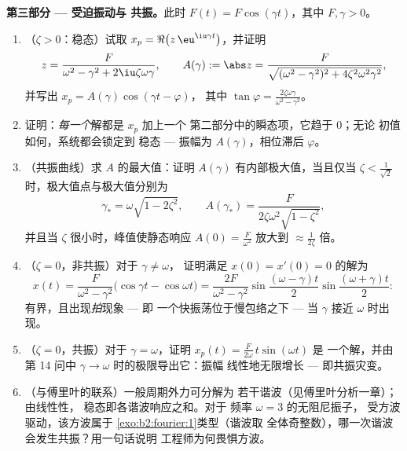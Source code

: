\begin{problem}
\medskip
\noindent\textbf{第三部分 --- 受迫振动与
共振。}此时 $F(t) = F\cos(\gamma t)$，其中 $F, \gamma > 0$。
\begin{enumerate}[resume]
  \item （$\zeta > 0$：稳态）试取 $x_p =
        \Re\bigl(z\,\eu^{\iu\gamma t}\bigr)$，并证明
        \[
        z = \frac{F}{\omega^2 - \gamma^2 +
        2\iu\zeta\omega\gamma},
        \qquad
        A(\gamma) := \abs z = \frac{F}{\sqrt{(\omega^2 -
        \gamma^2)^2 + 4\zeta^2\omega^2\gamma^2}} ,
        \]
        并写出 $x_p = A(\gamma)\cos(\gamma t - \varphi)$，
        其中 $\tan\varphi =
        \frac{2\zeta\omega\gamma}{\omega^2-\gamma^2}$。
  \item 证明：\emph{每一个}解都是 $x_p$ 加上一个
        第二部分中的瞬态项，它趋于 $0$；无论
        初值如何，系统都会锁定到
        稳态 --- 振幅为 $A(\gamma)$，相位滞后
        $\varphi$。
  \item （共振曲线）求 $A$ 的最大值：证明
        $A(\gamma)$ 有内部极大值，当且仅当 $\zeta <
        \frac{1}{\sqrt2}$ 时，极大值点与极大值分别为
        \[
        \gamma_* = \omega\sqrt{1 - 2\zeta^2},
        \qquad
        A(\gamma_*) =
        \frac{F}{2\zeta\omega^2\sqrt{1-\zeta^2}} ,
        \]
        并且当 $\zeta$ 很小时，峰值使静态响应
        $A(0) = \frac F{\omega^2}$ 放大到
        $\approx \frac{1}{2\zeta}$ 倍。
  \item （$\zeta = 0$，非共振）对于 $\gamma \neq \omega$，
        证明满足 $x(0) = x'(0) = 0$ 的解为
        \[
        x(t) = \frac{F}{\omega^2 -
        \gamma^2}\bigl(\cos\gamma t - \cos\omega t\bigr)
        = \frac{2F}{\omega^2-\gamma^2}
        \sin\frac{(\omega-\gamma)t}{2}
        \sin\frac{(\omega+\gamma)t}{2} :
        \]
        有界，且出现\emph{拍}现象 --- 即
        一个快振荡位于慢包络之下 --- 当 $\gamma$ 接近
        $\omega$ 时出现。
  \item （$\zeta = 0$，共振）对于 $\gamma = \omega$，证明
        $x_p(t) = \frac{F}{2\omega}\,t\sin(\omega t)$ 是
        一个解，并由第
        14 问中 $\gamma \to \omega$ 时的极限导出它：振幅
        线性地无限增长 --- 即共振灾变。
  \item （与傅里叶的联系）一般周期外力可分解为
        若干谐波（见傅里叶分析一章）；由线性性，
        稳态即各谐波响应之和。对于
        频率 $\omega = 3$ 的无阻尼振子，
        受方波驱动，该方波属于
        \cref{exo:b2:fourier:1}类型（谐波取
        全体奇整数），哪一次谐波会发生共振？用一句话说明
        工程师为何畏惧方波。
\end{enumerate}


\end{problem}
